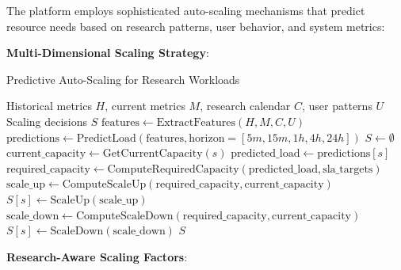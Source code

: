 \documentclass[10pt,twocolumn]{article}
\begin{document}
The platform employs sophisticated auto-scaling mechanisms that predict resource needs based on research patterns, user behavior, and system metrics:

\textbf{Multi-Dimensional Scaling Strategy}:

\begin{algorithm}[H]
\caption{Predictive Auto-Scaling for Research Workloads}
\label{alg:predictive_scaling}
\begin{algorithmic}[1]
\REQUIRE Historical metrics $H$, current metrics $M$, research calendar $C$, user patterns $U$
\ENSURE Scaling decisions $S$
\STATE $\text{features} \leftarrow \text{ExtractFeatures}(H, M, C, U)$
\STATE $\text{predictions} \leftarrow \text{PredictLoad}(\text{features}, \text{horizon}=[5m, 15m, 1h, 4h, 24h])$
\STATE $S \leftarrow \emptyset$
    \STATE $\text{current\_capacity} \leftarrow \text{GetCurrentCapacity}(s)$
    \STATE $\text{predicted\_load} \leftarrow \text{predictions}[s]$
    \STATE $\text{required\_capacity} \leftarrow \text{ComputeRequiredCapacity}(\text{predicted\_load}, \text{sla\_targets})$
        \STATE $\text{scale\_up} \leftarrow \text{ComputeScaleUp}(\text{required\_capacity}, \text{current\_capacity})$
        \STATE $S[s] \leftarrow \text{ScaleUp}(\text{scale\_up})$
        \STATE $\text{scale\_down} \leftarrow \text{ComputeScaleDown}(\text{required\_capacity}, \text{current\_capacity})$
        \STATE $S[s] \leftarrow \text{ScaleDown}(\text{scale\_down})$
    \ENDIF
\ENDFOR
\RETURN $S$
\end{algorithmic}
\end{algorithm}

\textbf{Research-Aware Scaling Factors}:
\end{document}

